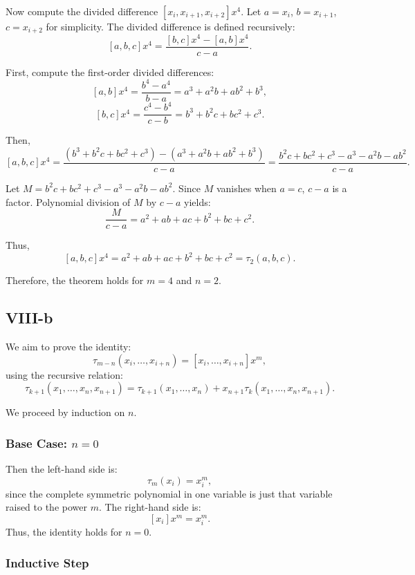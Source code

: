 \documentclass[a4paper]{article}
\begin{document}
Now compute the divided difference \( [x_i, x_{i+1}, x_{i+2}] x^4 \). Let \( a = x_i \), \( b = x_{i+1} \), \( c = x_{i+2} \) for simplicity. The divided difference is defined recursively:
\[
[a, b, c] x^4 = \frac{ [b, c] x^4 - [a, b] x^4 }{ c - a }.
\]

First, compute the first-order divided differences:
\[
[a, b] x^4 = \frac{b^4 - a^4}{b - a} = a^3 + a^2 b + a b^2 + b^3,
\]
\[
[b, c] x^4 = \frac{c^4 - b^4}{c - b} = b^3 + b^2 c + b c^2 + c^3.
\]

Then,
\[
[a, b, c] x^4 = \frac{ (b^3 + b^2 c + b c^2 + c^3) - (a^3 + a^2 b + a b^2 + b^3) }{ c - a } = \frac{ b^2 c + b c^2 + c^3 - a^3 - a^2 b - a b^2 }{ c - a }.
\]

Let \( M = b^2 c + b c^2 + c^3 - a^3 - a^2 b - a b^2 \). Since \( M \) vanishes when \( a = c \), \( c - a \) is a factor. Polynomial division of \( M \) by \( c - a \) yields:
\[
\frac{M}{c - a} = a^2 + a b + a c + b^2 + b c + c^2.
\]

Thus,
\[
[a, b, c] x^4 = a^2 + a b + a c + b^2 + b c + c^2 = \tau_2(a, b, c).
\]

Therefore, the theorem holds for \( m = 4 \) and \( n = 2 \).

\subsection*{VIII-b}

We aim to prove the identity:
\[
\tau_{m-n}(x_i, \ldots, x_{i+n}) = [x_i, \ldots, x_{i+n}] x^m,
\]
using the recursive relation:
\[
\tau_{k+1}(x_1, \ldots, x_n, x_{n+1}) = \tau_{k+1}(x_1, \ldots, x_n) + x_{n+1} \tau_k(x_1, \ldots, x_n, x_{n+1}). \tag{3.54}
\]

We proceed by induction on \( n \).

\subsubsection*{Base Case: \( n = 0 \)}

Then the left-hand side is:
\[
\tau_{m}(x_i) = x_i^m,
\]
since the complete symmetric polynomial in one variable is just that variable raised to the power \( m \). The right-hand side is:
\[
[x_i] x^m = x_i^m.
\]
Thus, the identity holds for \( n = 0 \).

\subsubsection*{Inductive Step}
\end{document}
